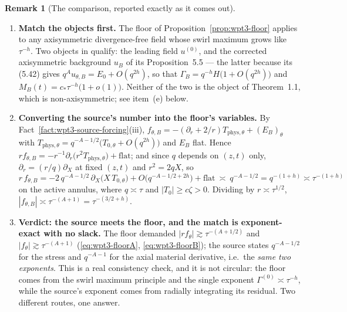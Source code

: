 \documentclass[11pt]{article}
\theoremstyle{definition}
\newtheorem{remark}[theorem]{Remark}
\theoremstyle{remark}
\newcommand{\abs}[1]{\left|#1\right|}
\begin{document}
\begin{remark}[The comparison, reported exactly as it comes out]
  \label{rem:wpt3-comparison}
  \begin{enumerate}[label=(\alph*),leftmargin=2.2em]
    \item \textbf{Match the objects first.} The floor of
      Proposition~\ref{prop:wpt3-floor} applies to any axisymmetric
      divergence-free field whose swirl maximum grows like $\tau^{-h}$. Two
      objects in \cite{OpenAI2026} qualify: the leading field $u^{(0)}$, and
      the corrected axisymmetric background $u_B$ of its Proposition~5.5 ---
      the latter because its (5.42) gives $q^Au_{\theta,B}=E_0+O(q^{2h})$, so
      that $\Gamma_B=q^{-h}H\bigl(1+O(q^{2h})\bigr)$ and
      $M_B(t)=c_*\tau^{-h}\bigl(1+o(1)\bigr)$. Neither of the two is the
      object of Theorem~1.1, which is non-axisymmetric; see item~(e) below.
    \item \textbf{Converting the source's number into the floor's variables.}
      By Fact~\ref{fact:wpt3-source-forcing}(iii),
      $f_{\theta,B}=-(\partial_r+2/r)T_{\mathrm{phys},\theta}+(E_B)_\theta$
      with $T_{\mathrm{phys},\theta}
        =q^{-A-1/2}\bigl(T_{0,\theta}+O(q^{2h})\bigr)$ and $E_B$ flat.
      Hence $rf_{\theta,B}=-r^{-1}\partial_r
        \bigl(r^2T_{\mathrm{phys},\theta}\bigr)+\text{flat}$; and since $q$
      depends on $(z,t)$ only, $\partial_r=(r/q)\partial_X$ at fixed $(z,t)$
      and $r^2=2qX$, so
      \[
        r\,f_{\theta,B}
          =-2\,q^{-A-1/2}\,\partial_X\bigl(X\,T_{0,\theta}\bigr)
           +O\bigl(q^{-A-1/2+2h}\bigr)+\text{flat}
          \ \asymp\ q^{-A-1/2}=q^{-(1+h)}\asymp\tau^{-(1+h)}
      \]
      on the active annulus, where $q\asymp\tau$ and
      $\abs{T_0}\geq c\zeta>0$. Dividing by $r\asymp\tau^{1/2}$,
      $\abs{f_{\theta,B}}\asymp\tau^{-(A+1)}=\tau^{-(3/2+h)}$.
    \item \textbf{Verdict: the source meets the floor, and the match is
      exponent-exact with no slack.} The floor demanded
      $\abs{rf_\theta}\gtrsim\tau^{-(A+1/2)}$ and
      $\abs{f_\theta}\gtrsim\tau^{-(A+1)}$
      (\eqref{eq:wpt3-floorA}, \eqref{eq:wpt3-floorB}); the source states
      $q^{-A-1/2}$ for the stress and $q^{-A-1}$ for the axial material
      derivative, i.e.\ the \emph{same two exponents}. This is a real
      consistency check, and it is not circular: the floor comes from the
      swirl maximum principle and the single exponent
      $\Gamma^{(0)}\asymp\tau^{-h}$, while the source's exponent comes from
      radially integrating its residual. Two different routes, one answer.

\end{enumerate}
\end{remark}
\end{document}
